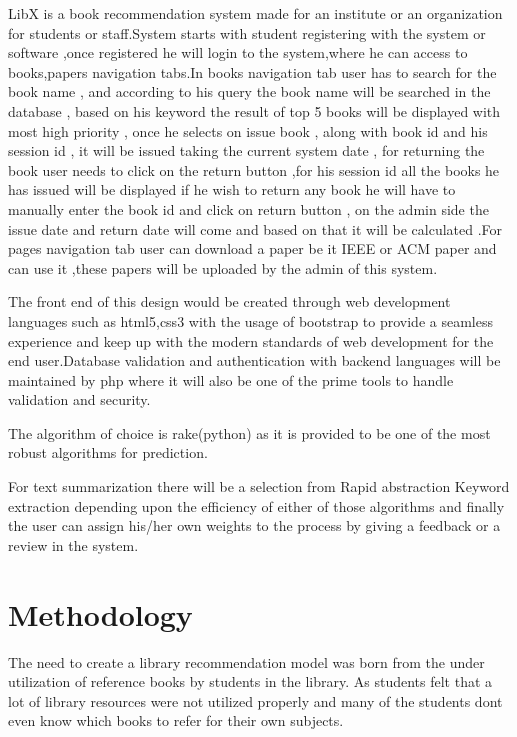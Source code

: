 \documentclass[a4paper,12pt]{report}
\begin{document}
\par LibX is a book recommendation system made for an institute or an organization for students or staff.System starts with student registering with the system or software ,once registered he will login to the system,where he can access to books,papers navigation tabs.In books navigation tab user has to search for the book name , and according to his query the book name will be searched in the database , based on his keyword the result of top 5 books will be displayed with most high
priority , once he selects on issue book , along with book id and his session id , it will be issued taking the current system date , for returning the book user needs to click on the return button ,for his session id all the books he has issued will be displayed if he wish to return any book he will have to manually enter the book id and click on return button , on
the admin side the issue date and return date will come and based on that it will be calculated .For pages navigation tab user can download a paper be it IEEE or ACM paper and can use it ,these papers will be uploaded by the admin of this system.\\

\par The front end of this design would be created through web development languages such as html5,css3 with the usage of bootstrap to provide a seamless experience and keep up with the modern standards of web development for the end user.Database validation and authentication with backend languages will be maintained by php where it will also be one of the prime tools to handle validation and security.\\

\par The algorithm of choice is rake(python) as it is provided to be one of the most robust algorithms for prediction.\\

\par For text summarization there will be a selection from Rapid abstraction Keyword extraction depending upon the efficiency of either of those algorithms and finally the user can assign his/her own weights to the process by giving a feedback or a review in the system.\\

\section{Methodology}  %
\par The need to create a library recommendation model was born from the under utilization of reference books by students in the library. As students felt that a lot of library resources were not utilized properly and many of the students dont even know which books to refer for their own subjects.\\
\end{document}
